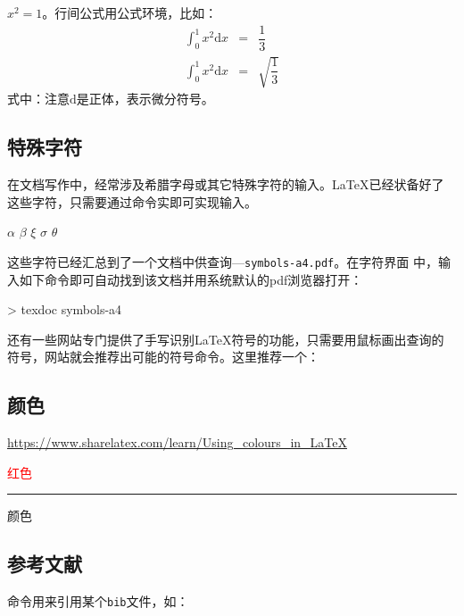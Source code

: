 \begin{codeout}
  $x^2=1$。行间公式用公式环境，比如：
  \begin{eqnarray}
    \int_{0}^{1} x^2 \mathrm{d}x & = & \dfrac{1}{3} \\
    \int_{0}^{1} x^2 \mathrm{d}x & = & \sqrt{ \dfrac{1}{3}} 
  \end{eqnarray}
  式中：注意$\mathrm{d}$是正体，表示微分符号。
\end{codeout}

\subsection{特殊字符}

在文档写作中，经常涉及希腊字母或其它特殊字符的输入。\LaTeX{}已经状备好了
这些字符，只需要通过命令实即可实现输入。

\begin{codeout}
  $\alpha$ $\beta$ $\xi$ $\sigma$ $\theta$
\end{codeout}

这些字符已经汇总到了一个文档中供查询—\texttt{symbols-a4.pdf}。在字符界面
中，输入如下命令即可自动找到该文档并用系统默认的pdf浏览器打开：

\begin{cmd}
  > texdoc symbols-a4
\end{cmd}

还有一些网站专门提供了手写识别\LaTeX{}符号的功能，只需要用鼠标画出查询的
符号，网站就会推荐出可能的符号命令。这里推荐一个：

\subsection{颜色}
\url{https://www.sharelatex.com/learn/Using_colours_in_LaTeX}

\begin{codeout}
  \textcolor{red}{红色}

  {\color{blue} \rule{\linewidth}{0.5mm}}

  \colorbox{BurntOrange}{颜色}
\end{codeout}

\subsection{参考文献}

命令\verb!!用来引用某个\texttt{bib}文件，如：
\begin{code}
  
\end{code}

